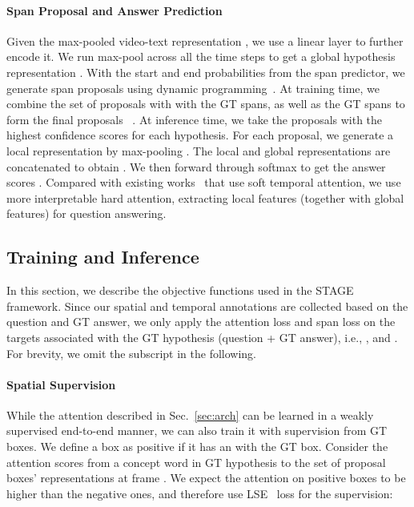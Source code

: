 \documentclass[11pt,a4paper]{article}
\begin{document}
\paragraph{Span Proposal and Answer Prediction} 
Given the max-pooled video-text representation , we use a linear layer to further encode it. 
We run max-pool across all the time steps to get a global hypothesis representation . 
With the start and end probabilities from the span predictor, we generate span proposals using dynamic programming~\cite{Seo2017BidirectionalAF}. 
At training time, we combine the set of proposals with  with the GT spans, as well as the GT spans to form the final proposals ~\cite{Ren2015FasterRT}. 
At inference time, we take the proposals with the highest confidence scores for each hypothesis. 
For each proposal, we generate a local representation  by max-pooling . 
The local and global representations are concatenated to obtain . 
We then forward  through softmax to get the answer scores . 
Compared with existing works~\cite{Jang2017TGIFQATS,Zhao2017VideoQA} that use soft temporal attention, we use more interpretable hard attention, extracting local features (together with global features) for question answering.


\subsection{Training and Inference}\label{training_inference}
    
In this section, we describe the objective functions used in the STAGE framework. 
Since our spatial and temporal annotations are collected based on the question and GT answer, we only apply the attention loss and span loss on the targets associated with the GT hypothesis (question + GT answer), i.e., ,  and . 
For brevity, we omit the subscript  in the following. 

\paragraph{Spatial Supervision} 
While the attention described in Sec.~\ref{sec:arch} can be learned in a weakly supervised end-to-end manner, we can also train it with supervision from GT boxes.
We define a box as positive if it has an  with the GT box. 
Consider the attention scores  from a concept word  in GT hypothesis  to the set of proposal boxes' representations  at frame . 
We expect the attention on positive boxes to be higher than the negative ones, and therefore use LSE~\cite{Li2017ImprovingPR} loss for the supervision:
\end{document}
